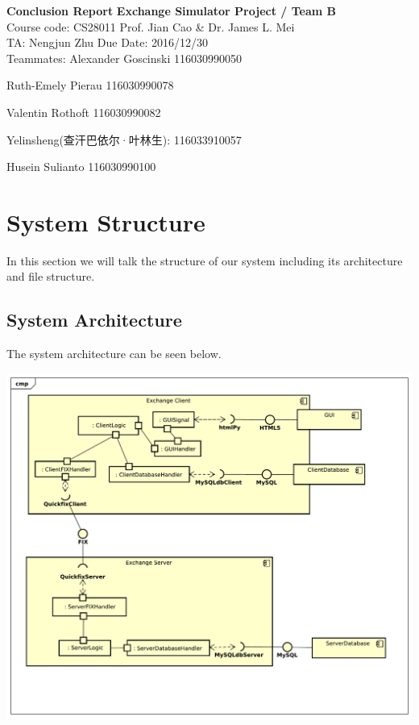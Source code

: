 \documentclass[a4paper, 11pt]{article}
\begin{document}
\noindent

\large\textbf{Conclusion Report}
\hfill \textbf{Exchange Simulator Project / Team B} \\

\normalsize Course code: CS28011 \hfill Prof. Jian Cao \& Dr. James L. Mei\\

TA: Nengjun Zhu  \hfill Due Date: 2016/12/30 \\

Teammates:
Alexander Goscinski 116030990050

Ruth-Emely Pierau 116030990078

Valentin Rothoft 116030990082

Yelinsheng(查汗巴依尔·叶林生): 116033910057

Husein Sulianto 116030990100

\section*{System Structure}
In this section we will talk the structure of our system including its architecture and file structure.

\subsection*{System Architecture}
The system architecture can be seen below.

\begin{center}\includegraphics[scale=0.4]{../diagrams/Component_Diagram_final.pdf}\end{center}
\end{document}
